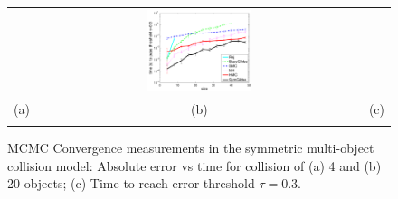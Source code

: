 \documentclass[]{article}
\newcommand{\nnn}{0.33}
\newcommand{\nnh}{0.23}
\begin{document}
\begin{figure}[t!]
\begin{center}
\begin{tabular}{ccc}
& \hspace{-3mm} \includegraphics[width=\nnn\textwidth, height=\nnh\textwidth]{plotsx/collisionx/time_vs_param-errorbar.pdf}%
\vspace{-1.5mm}
\\
\hspace{-5mm} \footnotesize(a) 
& \hspace{-4mm} \footnotesize(b) 
& \hspace{-3mm} \footnotesize(c) \\
\multicolumn{3}{c}{}
\end{tabular}
\end{center}
\vspace{-6mm}
\caption{\footnotesize 
MCMC Convergence measurements in the symmetric multi-object collision model: 
Absolute error vs time for collision of (a) 4 and (b) 20 objects; (c) Time to reach error threshold $\tau=0.3$.}
\label{fig:multi-object.mom}
\vspace{-2mm}
\end{figure}
\end{document}
